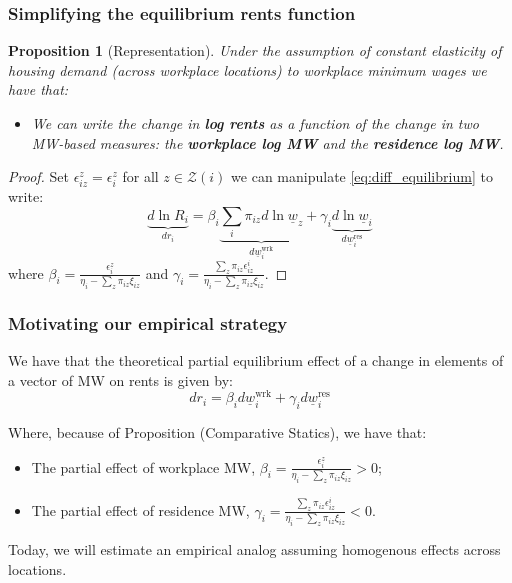 \documentclass[aspectratio=169, t]{beamer}
\newtheorem{prop}{Proposition}
\newcommand{\Z}{\mathcal{Z}}
\newcommand{\MW}{\underline{w}}
\begin{document}
\begin{frame}[label = representation_prop]
    \frametitle{Simplifying the equilibrium rents function}
    
	\begin{prop}[Representation]\label{prop:representation}
		Under the assumption of constant elasticity of housing demand (across workplace locations)
		to workplace minimum wages we have that:
		\begin{itemize}
			\item We can write the change in \textbf{log rents} as a function of the change in two 
			MW-based measures: the \textbf{workplace log MW} and the \textbf{residence log MW}.
		\end{itemize}
	\end{prop}

	\pause
	\vspace{2mm}

	\begin{proof}
		Set $\epsilon_{iz}^z = \epsilon_i^z$ for all $z\in\Z(i)$ 
		we can manipulate \eqref{eq:diff_equilibrium} to write:
		\begin{equation} \label{eq:theory_represenation}
			\underbrace{d \ln R_i}_{dr_i} 
			    = \beta_i \underbrace{\sum_i \pi_{iz} d\ln \MW_z}_{d\MW^{\text{wrk}}_{i}}
				+ \gamma_i \underbrace{d \ln \MW_i}_{d\MW^{\text{res}}_{i}}
		\end{equation}
		where $\beta_i = \frac{\epsilon_{i}^z}{\eta_{i} - \sum_z \pi_{iz} \xi_{iz}}$ 
		and $\gamma_i = \frac{\sum_z \pi_{iz} \epsilon_{iz}^i}{\eta_{i} - \sum_z \pi_{iz} \xi_{iz}}$.
	\end{proof}
\end{frame}

\begin{frame}
	\frametitle{Motivating our empirical strategy}
	We have that the theoretical partial equilibrium effect of a change in elements of a vector of MW on rents is given by:
		\begin{equation}
				d r_i = \beta_i d \MW^{\text{wrk}}_{i}+ \gamma_i d \MW^{\text{res}}_i
			\end{equation}
			
	Where, because of Proposition (Comparative Statics), we have that:
	\begin{itemize}
		\item The partial effect of workplace MW, $\beta_i = \frac{\epsilon_{i}^z}{\eta_{i} - \sum_z \pi_{iz} \xi_{iz}} > 0$;
		\item The partial effect of residence MW, $\gamma_i = \frac{\sum_z \pi_{iz} \epsilon_{iz}^i}{\eta_{i} 
				- \sum_z \pi_{iz} \xi_{iz}} < 0$.
	\end{itemize}

	\pause
	\vspace{2mm}
	Today, we will estimate an empirical analog assuming homogenous effects across 
	locations.

\end{frame}
\end{document}
